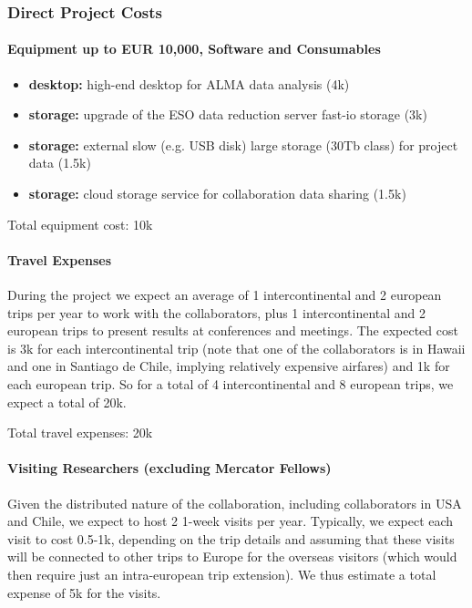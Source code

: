 \documentclass[10pt,fleqn,twoside]{article}
\begin{document}
\subsubsection{Direct Project Costs}


\paragraph{Equipment up to EUR 10,000, Software and Consumables}

\begin{itemize}
\item {\bf desktop:} high-end desktop for ALMA data analysis (4k\EUR{}) 
\item {\bf storage:} upgrade of the ESO data reduction server fast-io storage (3k\EUR{})
\item {\bf storage:} external slow (e.g. USB disk) large storage (30Tb class) for project data (1.5k\EUR{})
\item {\bf storage:} cloud storage service for collaboration data sharing (1.5k\EUR{})
\end{itemize}

Total equipment cost: 10k\EUR{}  

\paragraph{Travel Expenses}

During the project we expect an average of 1 intercontinental and 2 european
trips per year to work with the collaborators, plus 1 intercontinental and 2
european trips to present results at conferences and meetings. The expected
cost is 3k\EUR{} for each intercontinental trip (note that one of the
collaborators is in Hawaii and one in Santiago de Chile, implying relatively
expensive airfares) and 1k\EUR{} for each european trip. So for a total of
4 intercontinental and 8 european trips, we expect a total of 20k\EUR{}.  \smallskip

\smallskip

Total travel expenses: 20k\EUR{}


\paragraph{Visiting Researchers (excluding Mercator Fellows)}
Given the distributed nature of the collaboration, including collaborators in USA and Chile, we expect to host 2 1-week visits per year. Typically, we expect each visit to cost 0.5-1k\EUR{}, depending on the trip details and assuming that these visits will be connected to other trips to Europe for the overseas visitors (which would then require just an intra-european trip extension). We thus estimate a total expense of 5k\EUR{} for the visits.
\end{document}
